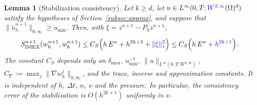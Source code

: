 \documentclass[11pt]{article}
\newtheorem{lemma}{Lemma}
\theoremstyle{remark}\newtheorem{remark}{Remark}
\newcommand{\tu}{\tilde u_h}
\newcommand{\Simex}{S_{\mathrm{IMEX}}}
\newcommand{\Ph}{P_h}
\theoremstyle{plain}
\newcommand{\new}[1]{{\color{blue}#1}}
\begin{document}
\begin{lemma}[Stabilization consistency]\label{lem:stabilization-consistency}
Let $k\ge d$, let $u\in L^\infty(0,T;\new{W^{2,\infty}}(\Omega)^d)$ satisfy the hypotheses of Section~\ref{subsec:approx}, and suppose that $\|\tu^{n+1}\|_{0,\infty}\ge u_{\min}$. Then, with $\xi=z^{n+1}-\Ph z^{n+1}$,
\begin{equation}\label{eq:stabilization-consistency-lemma}
\Simex^{n+1}(w_h^{n+1},w_h^{n+1})
\le C_S\Big(h\,E^n+h^{2k+3}+\new{\|\xi\|_*^2}\Big)
\le C_S\Big(h\,E^n+\new{h^{2k+1}}\Big).
\end{equation}
The constant $C_S$ depends only on $\delta_{\max}$, $u_{\min}^{-1}$, $\|u\|_{L^\infty(0,T;W^{2,\infty})}$, $C_\nabla:=\max_j\|\nabla w_h^j\|_{0,\infty}$, and the trace, inverse and approximation constants. It is independent of $h$, $\Delta t$, $n$, $\nu$ and the pressure. \new{In particular, the consistency error of the stabilization is $O(h^{2k+1})$ uniformly in $\nu$.}
\end{lemma}
\end{document}
